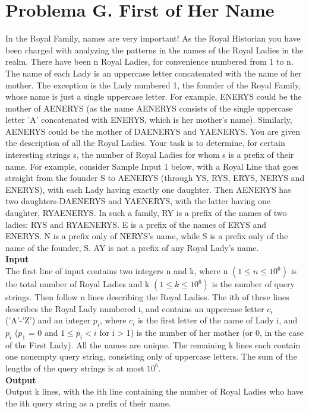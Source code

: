 \documentclass{report}
\begin{document}
\section{Problema G. First of Her Name}
In the Royal Family, names are very important! As the Royal Historian you have been charged with
analyzing the patterns in the names of the Royal Ladies in the realm.
There have been n Royal Ladies, for convenience numbered from 1 to n. The name of each Lady is an
uppercase letter concatenated with the name of her mother. The exception is the Lady numbered 1, the
founder of the Royal Family, whose name is just a single uppercase letter.
For example, ENERYS could be the mother of AENERYS (as the name AENERYS consists of the single
uppercase letter 'A' concatenated with ENERYS, which is her mother's name). Similarly, AENERYS
could be the mother of DAENERYS and YAENERYS.
You are given the description of all the Royal Ladies. Your task is to determine, for certain interesting
strings s, the number of Royal Ladies for whom s is a prefix of their name.
For example, consider Sample Input 1 below, with a Royal Line that goes straight from the founder S
to AENERYS (through YS, RYS, ERYS, NERYS and ENERYS), with each Lady having exactly one
daughter. Then AENERYS has two daughters-DAENERYS and YAENERYS, with the latter having
one daughter, RYAENERYS.
In such a family, RY is a prefix of the names of two ladies: RYS and RYAENERYS. E is a prefix of the
names of ERYS and ENERYS. N is a prefix only of NERYS's name, while S is a prefix only of the name
of the founder, S. AY is not a prefix of any Royal Lady's name.\\
{\bf Input}\\
The first line of input contains two integers n and k, where n $(1 \leq n \leq 10^6)$ is the total number of Royal
Ladies and k $(1 \leq k \leq 10^6)$ is the number of query strings.
Then follow n lines describing the Royal Ladies. The ith of these lines describes the Royal Lady numbered i, and contains an uppercase letter $c_i$ ('A'-'Z') and an integer $p_i$, where $c_i$ is the first letter of the
name of Lady i, and $p_i$ ($p_1$ = 0 and $1 \leq p_i < i$ for i > 1) is the number of her mother (or 0, in the case
of the First Lady). All the names are unique.
The remaining k lines each contain one nonempty query string, consisting only of uppercase letters. The
sum of the lengths of the query strings is at most $10^6$.\\
{\bf Output}\\
Output k lines, with the ith line containing the number of Royal Ladies who have the ith query string as
a prefix of their name.
\end{document}
